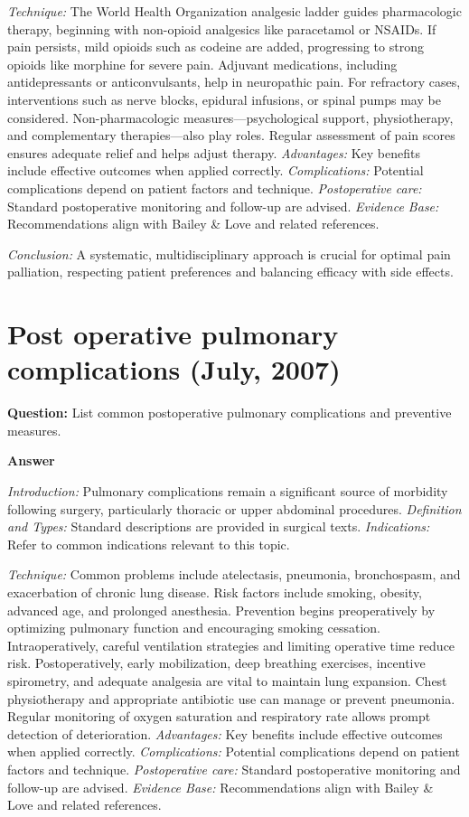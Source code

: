 \documentclass{article}
\begin{document}
\emph{Technique:} The World Health Organization analgesic ladder guides pharmacologic therapy, beginning with non-opioid analgesics like paracetamol or NSAIDs. If pain persists, mild opioids such as codeine are added, progressing to strong opioids like morphine for severe pain. Adjuvant medications, including antidepressants or anticonvulsants, help in neuropathic pain. For refractory cases, interventions such as nerve blocks, epidural infusions, or spinal pumps may be considered. Non-pharmacologic measures—psychological support, physiotherapy, and complementary therapies—also play roles. Regular assessment of pain scores ensures adequate relief and helps adjust therapy.
\emph{Advantages:} Key benefits include effective outcomes when applied correctly.
\emph{Complications:} Potential complications depend on patient factors and technique.
\emph{Postoperative care:} Standard postoperative monitoring and follow-up are advised.
\emph{Evidence Base:} Recommendations align with Bailey & Love and related references.

\emph{Conclusion:} A systematic, multidisciplinary approach is crucial for optimal pain palliation, respecting patient preferences and balancing efficacy with side effects.


\section{Post operative pulmonary complications (July, 2007)}

\textbf{Question:} List common postoperative pulmonary complications and preventive measures.

\textbf{Answer}

\emph{Introduction:} Pulmonary complications remain a significant source of morbidity following surgery, particularly thoracic or upper abdominal procedures.
\emph{Definition and Types:} Standard descriptions are provided in surgical texts.
\emph{Indications:} Refer to common indications relevant to this topic.

\emph{Technique:} Common problems include atelectasis, pneumonia, bronchospasm, and exacerbation of chronic lung disease. Risk factors include smoking, obesity, advanced age, and prolonged anesthesia. Prevention begins preoperatively by optimizing pulmonary function and encouraging smoking cessation. Intraoperatively, careful ventilation strategies and limiting operative time reduce risk. Postoperatively, early mobilization, deep breathing exercises, incentive spirometry, and adequate analgesia are vital to maintain lung expansion. Chest physiotherapy and appropriate antibiotic use can manage or prevent pneumonia. Regular monitoring of oxygen saturation and respiratory rate allows prompt detection of deterioration.
\emph{Advantages:} Key benefits include effective outcomes when applied correctly.
\emph{Complications:} Potential complications depend on patient factors and technique.
\emph{Postoperative care:} Standard postoperative monitoring and follow-up are advised.
\emph{Evidence Base:} Recommendations align with Bailey & Love and related references.
\end{document}
